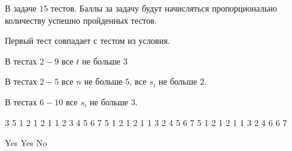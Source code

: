 \markSection

В задаче $15$ тестов. Баллы за задачу будут начисляться пропорционально количеству успешно пройденных тестов.

Первый тест совпадает с тестом из условия.

В тестах $2-9$ все $t$ не больше $3$

В тестах $2-5$ все $n$ не больше $5$, все $s_{i}$ не больше $2$.

В тестах $6-10$ все $s_{i}$ не больше $3$.


\begin{myverbbox}[\small]{\vinput}
    3
    5
    1 2 1 2 1
    1
    2 3
    4
    5 6
    7
    5
    1 2 1 2 1
    1
    3 2
    4
    5 6
    7
    5
    1 2 1 2 1
    1
    3 2
    4
    6 6
    7
\end{myverbbox}

\begin{myverbbox}[\small]{\voutput}
    Yes
    Yes
    No
\end{myverbbox}

